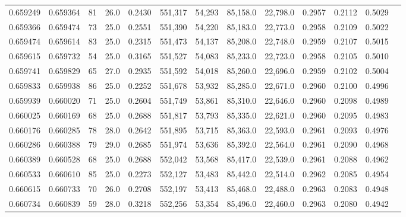 \begin{tabular}{rrrrrrrrrrrrr}
0.659249 & 0.659364 &    81 & 26.0 &                                     0.2430 & 551,317 &  54,293 &  85,158.0 &  22,798.0 & 0.2957 & 0.2112 & 0.5029 \\
0.659366 & 0.659474 &    73 & 25.0 &                                     0.2551 & 551,390 &  54,220 &  85,183.0 &  22,773.0 & 0.2958 & 0.2109 & 0.5022 \\
0.659474 & 0.659614 &    83 & 25.0 &                                     0.2315 & 551,473 &  54,137 &  85,208.0 &  22,748.0 & 0.2959 & 0.2107 & 0.5015 \\
0.659615 & 0.659732 &    54 & 25.0 &                                     0.3165 & 551,527 &  54,083 &  85,233.0 &  22,723.0 & 0.2958 & 0.2105 & 0.5010 \\
0.659741 & 0.659829 &    65 & 27.0 &                                     0.2935 & 551,592 &  54,018 &  85,260.0 &  22,696.0 & 0.2959 & 0.2102 & 0.5004 \\
0.659833 & 0.659938 &    86 & 25.0 &                                     0.2252 & 551,678 &  53,932 &  85,285.0 &  22,671.0 & 0.2960 & 0.2100 & 0.4996 \\
0.659939 & 0.660020 &    71 & 25.0 &                                     0.2604 & 551,749 &  53,861 &  85,310.0 &  22,646.0 & 0.2960 & 0.2098 & 0.4989 \\
0.660025 & 0.660169 &    68 & 25.0 &                                     0.2688 & 551,817 &  53,793 &  85,335.0 &  22,621.0 & 0.2960 & 0.2095 & 0.4983 \\
0.660176 & 0.660285 &    78 & 28.0 &                                     0.2642 & 551,895 &  53,715 &  85,363.0 &  22,593.0 & 0.2961 & 0.2093 & 0.4976 \\
0.660286 & 0.660388 &    79 & 29.0 &                                     0.2685 & 551,974 &  53,636 &  85,392.0 &  22,564.0 & 0.2961 & 0.2090 & 0.4968 \\
0.660389 & 0.660528 &    68 & 25.0 &                                     0.2688 & 552,042 &  53,568 &  85,417.0 &  22,539.0 & 0.2961 & 0.2088 & 0.4962 \\
0.660533 & 0.660610 &    85 & 25.0 &                                     0.2273 & 552,127 &  53,483 &  85,442.0 &  22,514.0 & 0.2962 & 0.2085 & 0.4954 \\
0.660615 & 0.660733 &    70 & 26.0 &                                     0.2708 & 552,197 &  53,413 &  85,468.0 &  22,488.0 & 0.2963 & 0.2083 & 0.4948 \\
0.660734 & 0.660839 &    59 & 28.0 &                                     0.3218 & 552,256 &  53,354 &  85,496.0 &  22,460.0 & 0.2963 & 0.2080 & 0.4942 \\

\end{tabular}
